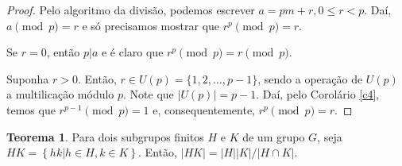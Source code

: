 \documentclass[a4paper,portuguese,11pt,twoside, leqno]{book}
\theoremstyle{definition}
\newtheorem{theorem}{Teorema}[section]
\begin{document}
	\begin{proof}
		Pelo algoritmo da divisão, podemos escrever $a = pm + r, 0\leq r < p$. Daí, $a\pmod p = r$ e só precisamos mostrar que $r^p\pmod p = r$.
		\par\vspace{0.3cm} Se $r = 0$, então $p|a$ e é claro que $r^p\pmod p = r\pmod p$.
		\par\vspace{0.3cm} Suponha $r>0$. Então, $r\in U(p) = \{1, 2, \dots, p-1\}$, sendo a operação de $U(p)$ a multilicação módulo $p$. Note que $|U(p)| = p-1$. Daí, pelo Corolário \eqref{c4}, temos que $r^{p-1}\pmod p = 1$ e, consequentemente, $r^p\pmod p = r$. 
	\end{proof}
	
	\begin{theorem}
		\label{ordem de HK}
		Para dois subgrupos finitos $H$ e $K$ de um grupo $G$, seja $HK = \left\{ hk| h\in H, k\in K \right\}$. Então, $|HK| = |H||K|/|H\cap K|$.
	\end{theorem}
	
\end{document}
